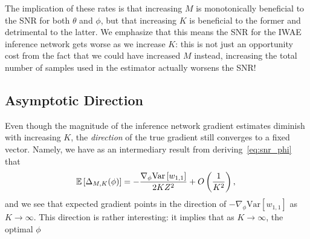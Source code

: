 The implication of these rates is that increasing $M$ is monotonically beneficial to
the \gls{SNR} for both $\theta$ and $\phi$, but that increasing $K$ is beneficial to the
former and detrimental to the latter.  We emphasize that this means the \gls{SNR} for the \gls{IWAE} inference network
gets worse as we increase $K$: this is not just an opportunity cost
from the fact that we could have increased $M$ instead, increasing the total number of samples
used in the estimator actually worsens the \gls{SNR}!

\subsection{Asymptotic Direction}
\label{sec:dir}

Even though the magnitude of the inference
network gradient estimates diminish with increasing $K$, the \emph{direction}
of the true gradient still converges to a fixed vector.
Namely, we have as an intermediary result from deriving~\eqref{eq:snr_phi}
that
\begin{align}
\label{eq:expt}
\hspace{-3pt}
\mathbb{E} \left[\Delta_{M,K} (\phi)\right] = -\frac{\nabla_{\phi} \text{Var}\left[w_{1,1}\right]}{2K Z^2} 
+O\left(\frac{1}{K^2}\right),
\end{align}
and we see that expected gradient points in the direction of
$-\nabla_{\phi} \text{Var}\left[w_{1,1}\right]$ as $K \to \infty$.  
This direction is rather interesting: it implies that as $K\to\infty$, the optimal $\phi$

